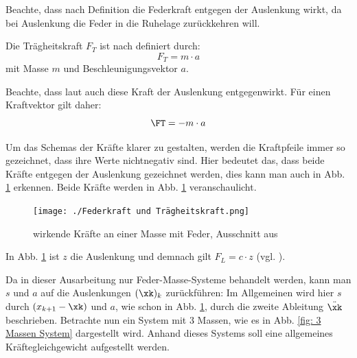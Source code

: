 \documentclass[a4paper,12pt]{report}
\newcommand{\1}{\mathds{1}}
\theoremstyle{plain} %
\theoremstyle{definition} %
\theoremstyle{remark}
\begin{document}
            Beachte, dass nach Definition die Federkraft entgegen der Auslenkung wirkt, da bei Auslenkung die Feder in die Ruhelage zurückkehren will.
                  
            Die Trägheitskraft $F_T$ ist nach \cite{trägheitskraft} definiert durch:
            \begin{equation}
                  \label{eqn: Trägheitskraft}
                  F_T = m\cdot a
            \end{equation}
            mit Masse $m$ und Beschleunigungsvektor $a$.    
            
            Beachte, dass laut \cite{trägheitskraft} auch diese Kraft der Auslenkung entgegenwirkt.
            Für einen Kraftvektor \FT gilt daher:
            $$\FT = -m\cdot a$$

            Um das Schemas der Kräfte klarer zu gestalten, werden die Kraftpfeile immer so gezeichnet, dass ihre Werte nichtnegativ sind.
            Hier bedeutet das, dass beide Kräfte entgegen der Auslenkung gezeichnet werden, dies kann man auch in Abb. \ref{fig: KräfteAnFeder} erkennen.
            Beide Kräfte werden in Abb. \ref{fig: KräfteAnFeder} veranschaulicht.

            \begin{figure}[h!t]
                  \centering
                  \texttt{[image: ./Federkraft und Trägheitskraft.png]}
                  \caption{wirkende Kräfte an einer Masse mit Feder, Ausschnitt aus \cite{BildKräfteFeder}}
                  \label{fig: KräfteAnFeder}
            \end{figure}
            In Abb. \ref{fig: KräfteAnFeder} ist $z$ die Auslenkung und demnach gilt $F_L = c\cdot z$ (vgl. \cite{federkraft}).

            Da in dieser Ausarbeitung nur Feder-Masse-Systeme behandelt werden, kann man $s$ und $a$ auf die Auslenkungen $(\xk)_k$ zurückführen:
            Im Allgemeinen wird hier $s$ durch $(x_{k+1}-\xk)$ und $a$, wie schon in Abb. \ref{fig: KräfteAnFeder}, durch die zweite Ableitung $\ddot \xk$ beschrieben.
            Betrachte nun ein System mit 3 Massen, wie es in Abb. \ref{fig: 3 Massen System} dargestellt wird.
            Anhand dieses Systems soll eine allgemeines Kräftegleichgewicht aufgestellt werden.
\end{document}
